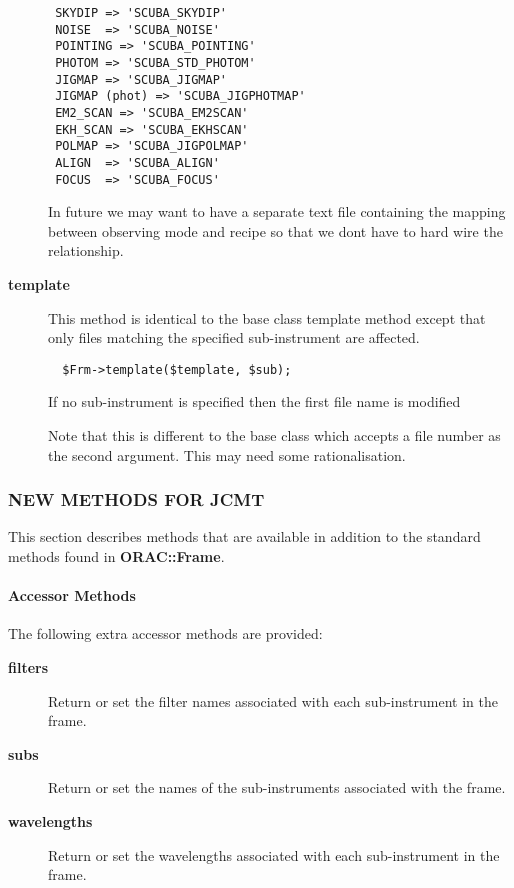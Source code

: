 \begin{description}
\begin{verbatim}
 SKYDIP => 'SCUBA_SKYDIP'
 NOISE  => 'SCUBA_NOISE'
 POINTING => 'SCUBA_POINTING'
 PHOTOM => 'SCUBA_STD_PHOTOM'
 JIGMAP => 'SCUBA_JIGMAP'
 JIGMAP (phot) => 'SCUBA_JIGPHOTMAP'
 EM2_SCAN => 'SCUBA_EM2SCAN'
 EKH_SCAN => 'SCUBA_EKHSCAN'
 POLMAP => 'SCUBA_JIGPOLMAP'
 ALIGN  => 'SCUBA_ALIGN'
 FOCUS  => 'SCUBA_FOCUS'
\end{verbatim}


In future we may want to have a separate text file containing
the mapping between observing mode and recipe so that
we dont have to hard wire the relationship.

\item[\textbf{template}] \mbox{}

This method is identical to the base class template method
except that only files matching the specified sub-instrument
are affected.

\begin{verbatim}
  $Frm->template($template, $sub);
\end{verbatim}


If no sub-instrument is specified then the first file name
is modified



Note that this is different to the base class which accepts
a file number as the second argument. This may need some
rationalisation.

\end{description}
\subsubsection*{NEW METHODS FOR JCMT\label{ORAC::Frame::JCMT_NEW_METHODS_FOR_JCMT}}

This section describes methods that are available in addition
to the standard methods found in \textbf{ORAC::Frame}.

\paragraph*{Accessor Methods\label{ORAC::Frame::JCMT_Accessor_Methods}}

The following extra accessor methods are provided:

\begin{description}
\item[\textbf{filters}] \mbox{}

Return or set the filter names associated with each sub-instrument
in the frame.

\item[\textbf{subs}] \mbox{}

Return or set the names of the sub-instruments associated
with the frame.

\item[\textbf{wavelengths}] \mbox{}

Return or set the wavelengths associated with each  sub-instrument
in the frame.

\end{description}
